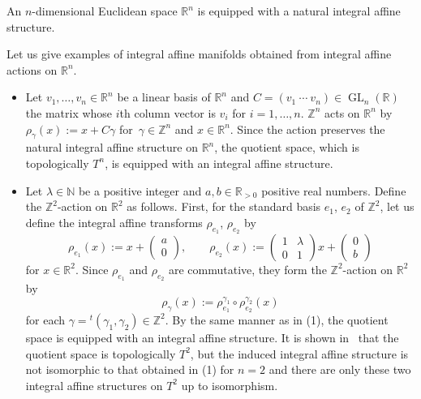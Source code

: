 \documentclass[pdftex]{sigma}
\numberwithin{equation}{section}
\newcommand{\R}{\mathbb{R}}
\newcommand{\Z}{\mathbb{Z}}
\newcommand{\N}{\mathbb{N}}
\def\GL{\operatorname{GL}}
\begin{document}
\begin{Example}\label{affine Euclidean}
An $n$-dimensional Euclidean space $\R^n$ is equipped with a natural integral affine structure.
\end{Example}

Let us give examples of integral affine manifolds obtained from integral affine actions on $\R^n$.
\begin{Example}\label{affine torus}\qquad
\begin{itemize}\itemsep=0pt
\item[(1)] Let $v_1,\ldots ,v_n\in \R^n$ be a linear basis of $\R^n$ and $C=(v_1\ \cdots\ v_n)\in \GL_n(\R)$ the matrix whose $i$th column vector is $v_i$ for $i=1,\ldots , n$. $\Z^n$ acts on $\R^n$ by $\rho_\gamma (x):=x+C\gamma$
for~${\gamma\in \Z^n}$ and $x\in \R^n$. Since the action preserves the natural integral affine structure on $\R^n$, the quotient space, which is topologically $T^n$, is equipped with an integral affine structure.
\item[(2)] Let $\lambda\in \N$ be a positive integer and $a, b\in \R_{>0}$ positive real numbers. Define the $\Z^2$-action on $\R^2$ as follows. First, for the standard basis $e_1$, $e_2$ of $\Z^2$, let us define the integral affine transforms $\rho_{e_1}$, $\rho_{e_2}$ by
\[
\rho_{e_1}(x):=x+
\begin{pmatrix}
a \\
0
\end{pmatrix},\qquad
\rho_{e_2}(x):=
\begin{pmatrix}
1 & \lambda \\
0 & 1
\end{pmatrix}
x+
\begin{pmatrix}
0 \\
b
\end{pmatrix}
\]
for $x\in \R^2$. Since $\rho_{e_1}$ and $\rho_{e_2}$ are commutative, they form the $\Z^2$-action on $\R^2$ by
\[
\rho_\gamma (x):=\rho_{e_1}^{\gamma_1}\circ \rho_{e_2}^{\gamma_2}(x)
\]
for each $\gamma={}^t(\gamma_1,\gamma_2)\in \Z^2$. By the same manner as in (1),
the quotient space is equipped with an integral affine structure. It is shown in~\cite[Theorem A]{Mis} that the quotient space is topologically $T^2$, but the induced integral affine structure is not isomorphic to that obtained in (1) for $n=2$ and there are only these two integral affine structures on $T^2$ up to isomorphism.
\end{itemize}
\end{Example}
\end{document}
